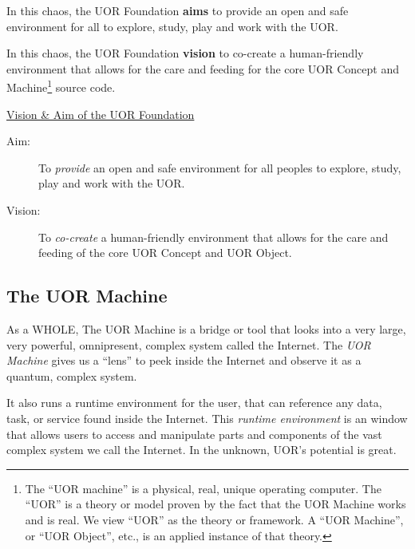 \documentclass[twocolumn,10pt]{article}
\begin{document}
In this chaos, the UOR Foundation \textbf{aims} to provide an open and safe environment for all to explore, study, play and work with the UOR\@.

In this chaos, the UOR Foundation \textbf{vision} to co-create a human-friendly environment that allows for the care and feeding for the core UOR Concept and Machine\footnote{The ``UOR machine'' is a physical, real, unique operating computer. The ``UOR'' is a theory or model proven by the fact that the UOR Machine works and is real. We view ``UOR'' as the theory or framework. A ``UOR Machine'', or ``UOR Object'', etc., is an applied instance of that theory.} source code.


\vspace{20pt}
\begin{minipage}{0.95\linewidth}
    \begin{tcolorbox}
    \begin{center}\underline{Vision \& Aim of the UOR Foundation}\end{center}
        \begin{description}
            \item[Aim:] To \textit{provide} an open and safe environment for all peoples to explore, study, play and work with the UOR\@. 
            \item[Vision:] To \textit{co-create} a human-friendly environment that allows for the care and feeding of the core UOR Concept and UOR Object. 
        \end{description}
    \end{tcolorbox}
\end{minipage}
\vspace{10pt}

\subsection*{The UOR Machine}
As a WHOLE, The UOR Machine is a bridge or tool that looks into a very large, very powerful, omnipresent, complex system called the Internet.
The \textit{UOR Machine} gives us a ``lens'' to peek inside the Internet and observe it as a quantum, complex system.

It also runs a runtime environment for the user, that can reference any data, task, or service found inside the Internet.
This \textit{runtime environment} is an window that allows users to access and manipulate parts and components of the vast complex system we call the Internet.
In the unknown, UOR's potential is great.
\end{document}
